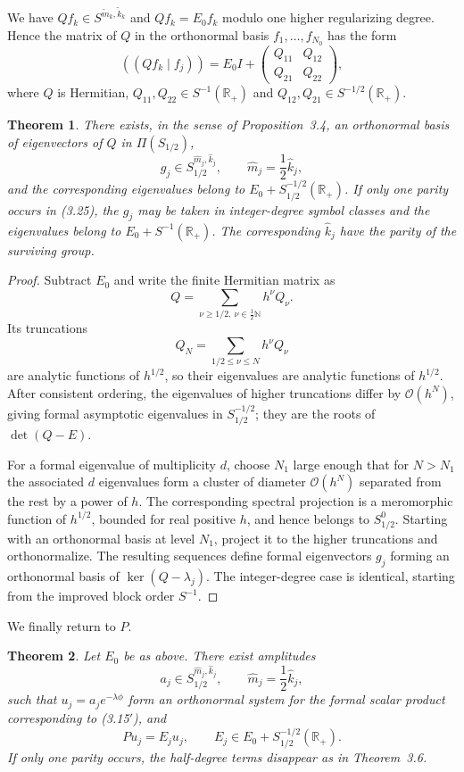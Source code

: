 \documentclass[11pt,a4paper]{article}
\newcommand{\R}{\mathbb R}
\newcommand{\N}{\mathbb N}
\newcommand{\cO}{\mathcal O}
\numberwithin{equation}{section}
\newtheorem{theorem}{Theorem}[section]
\theoremstyle{remark}
\begin{document}
We have $Qf_k\in S^{\widetilde m_k,\widetilde k_k}$ and $Qf_k=E_0f_k$ modulo one higher regularizing degree. Hence the matrix of $Q$ in the orthonormal basis $f_1,\ldots,f_{N_0}$ has the form
\begin{equation}
((Qf_k\mid f_j))=E_0I+
\begin{pmatrix}Q_{11}&Q_{12}\\Q_{21}&Q_{22}\end{pmatrix},
\end{equation}
where $Q$ is Hermitian, $Q_{11},Q_{22}\in S^{-1}(\R_+)$ and $Q_{12},Q_{21}\in S^{-1/2}(\R_+)$.

\begin{theorem}
There exists, in the sense of Proposition~3.4, an orthonormal basis of eigenvectors of $Q$ in $\Pi(S_{1/2})$,
\[
g_j\in S_{1/2}^{\widehat m_j,\widehat k_j},
\qquad \widehat m_j=\frac12\widehat k_j,
\]
and the corresponding eigenvalues belong to $E_0+S_{1/2}^{-1/2}(\R_+)$. If only one parity occurs in (3.25), the $g_j$ may be taken in integer-degree symbol classes and the eigenvalues belong to $E_0+S^{-1}(\R_+)$. The corresponding $\widehat k_j$ have the parity of the surviving group.
\end{theorem}
\begin{proof}
Subtract $E_0$ and write the finite Hermitian matrix as
\[
Q=\sum_{\nu\ge1/2,\ \nu\in\frac12\N}h^\nu Q_\nu.
\]
Its truncations
\[
Q_N=\sum_{1/2\le\nu\le N}h^\nu Q_\nu
\]
are analytic functions of $h^{1/2}$, so their eigenvalues are analytic functions of $h^{1/2}$. After consistent ordering, the eigenvalues of higher truncations differ by $\cO(h^N)$, giving formal asymptotic eigenvalues in $S_{1/2}^{-1/2}$; they are the roots of $\det(Q-E)$.

For a formal eigenvalue of multiplicity $d$, choose $N_1$ large enough that for $N>N_1$ the associated $d$ eigenvalues form a cluster of diameter $\cO(h^N)$ separated from the rest by a power of $h$. The corresponding spectral projection is a meromorphic function of $h^{1/2}$, bounded for real positive $h$, and hence belongs to $S_{1/2}^0$. Starting with an orthonormal basis at level $N_1$, project it to the higher truncations and orthonormalize. The resulting sequences define formal eigenvectors $g_j$ forming an orthonormal basis of $\ker(Q-\lambda_j)$. The integer-degree case is identical, starting from the improved block order $S^{-1}$.
\end{proof}

We finally return to $P$.

\begin{theorem}
Let $E_0$ be as above. There exist amplitudes
\[
a_j\in S_{1/2}^{\widehat m_j,\widehat k_j},
\qquad \widehat m_j=\frac12\widehat k_j,
\]
such that $u_j=a_je^{-\lambda\phi}$ form an orthonormal system for the formal scalar product corresponding to (3.15$'$), and
\[
Pu_j=E_ju_j,
\qquad E_j\in E_0+S_{1/2}^{-1/2}(\R_+).
\]
If only one parity occurs, the half-degree terms disappear as in Theorem~3.6.
\end{theorem}
\end{document}
